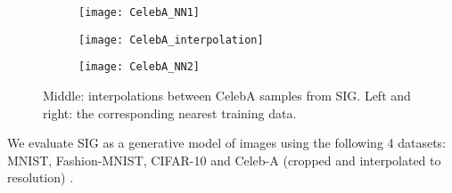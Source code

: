 \documentclass{article}
\begin{document}
\begin{figure}
     \centering
     \begin{subfigure}[]{0.08\linewidth}
         \centering \texttt{[image: CelebA\_NN1]}
     \end{subfigure}
     \hfill
     \begin{subfigure}[]{0.8\linewidth}
         \centering \texttt{[image: CelebA\_interpolation]}
     \end{subfigure}
     \hfill
     \begin{subfigure}[]{0.08\linewidth}
         \centering \texttt{[image: CelebA\_NN2]}
     \end{subfigure}
     \caption{Middle: interpolations between CelebA samples from SIG. Left and right: the corresponding nearest training data.}
     \label{fig:interpolation}
     \vskip -0.1in
\end{figure}



We evaluate SIG as a generative model of images using the following 4 datasets: MNIST, Fashion-MNIST, CIFAR-10 \citep{krizhevsky2009learning} and Celeb-A (cropped and interpolated to  resolution) \citep{liu2015faceattributes}.
\end{document}
